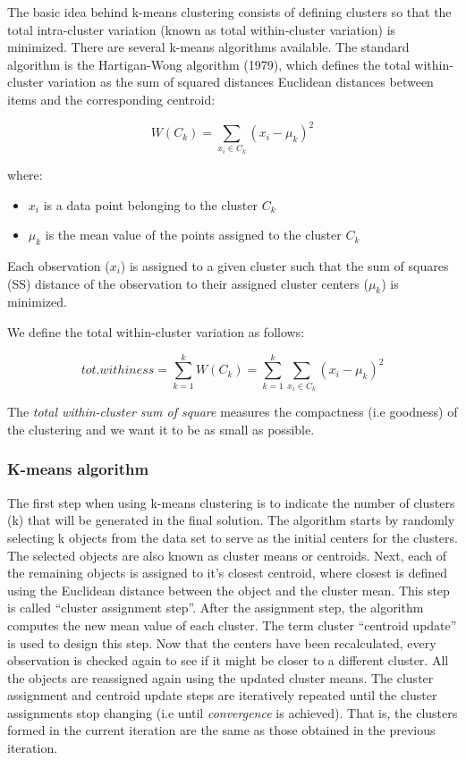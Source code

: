 \documentclass[]{book}
\providecommand{\tightlist}{%
  \setlength{\itemsep}{0pt}\setlength{\parskip}{0pt}}
\theoremstyle{definition}
\theoremstyle{definition}
\theoremstyle{definition}
\theoremstyle{remark}
\begin{document}
The basic idea behind k-means clustering consists of defining clusters
so that the total intra-cluster variation (known as total within-cluster
variation) is minimized. There are several k-means algorithms available.
The standard algorithm is the Hartigan-Wong algorithm (1979), which
defines the total within-cluster variation as the sum of squared
distances Euclidean distances between items and the corresponding
centroid:

\[W(C_k) = \sum_{x_i \in C_k}(x_i - \mu_k)^2 \tag{6}\]

where:

\begin{itemize}
\tightlist
\item
  \(x_i\) is a data point belonging to the cluster \(C_k\)
\item
  \(\mu_k\) is the mean value of the points assigned to the cluster
  \(C_k\)
\end{itemize}

Each observation (\(x_i\)) is assigned to a given cluster such that the
sum of squares (SS) distance of the observation to their assigned
cluster centers (\(\mu_k\)) is minimized.

We define the total within-cluster variation as follows:

\[tot.withiness = \sum^k_{k=1}W(C_k) = \sum^k_{k=1}\sum_{x_i \in C_k}(x_i - \mu_k)^2 \tag{7} \]

The \emph{total within-cluster sum of square} measures the compactness
(i.e goodness) of the clustering and we want it to be as small as
possible.

\hypertarget{k-means-algorithm}{%
\subsubsection{K-means algorithm}\label{k-means-algorithm}}

The first step when using k-means clustering is to indicate the number
of clusters (k) that will be generated in the final solution. The
algorithm starts by randomly selecting k objects from the data set to
serve as the initial centers for the clusters. The selected objects are
also known as cluster means or centroids. Next, each of the remaining
objects is assigned to it's closest centroid, where closest is defined
using the Euclidean distance between the object and the cluster mean.
This step is called ``cluster assignment step''. After the assignment
step, the algorithm computes the new mean value of each cluster. The
term cluster ``centroid update'' is used to design this step. Now that
the centers have been recalculated, every observation is checked again
to see if it might be closer to a different cluster. All the objects are
reassigned again using the updated cluster means. The cluster assignment
and centroid update steps are iteratively repeated until the cluster
assignments stop changing (i.e until \emph{convergence} is achieved).
That is, the clusters formed in the current iteration are the same as
those obtained in the previous iteration.
\end{document}
